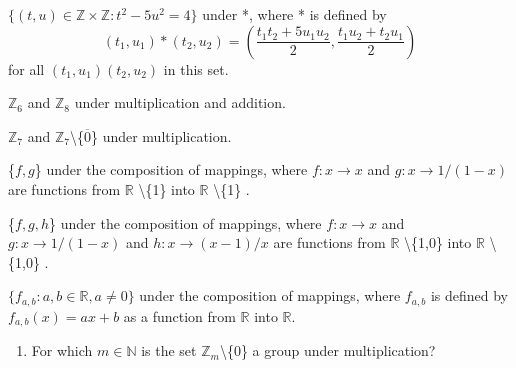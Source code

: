 \documentclass[11pt]{amsbook}
\begin{document}

\begin{hEnumerateAlpha}

	\item
	$\{(t,u) \in \mathbb{Z} \times \mathbb{Z} : t^2 - 5u^2 = 4\}$ under *, where * is defined by 
	\[ 
		(t_1,u_1) * ( t_2,u_2) = (\frac{t_1 t_2 + 5 u_1 u_2}{2}, \frac{t_1 u_2 + t_2 u_1}{2})
	\]
	for all $(t_1,u_1)(t_2,u_2)$ in this set.

	\item
	$\mathbb{Z}_6$ and $\mathbb{Z}_8$ under multiplication and addition.

	\item
	$\mathbb{Z}_7$ and $\mathbb{Z}_7$\textbackslash \{$\overline{0}$\} under multiplication.
	
	\item
	\{$f,g$\} under the composition of mappings, where $f: x \rightarrow x$ and $g: x \rightarrow 1/(1-x)$ are functions from $\mathbb{R}$ \textbackslash \{1\} into $\mathbb{R}$ \textbackslash \{1\} .

	\item
	\{$f,g,h$\} under the composition of mappings, where $f: x \rightarrow x$ and $g: x \rightarrow 1/(1-x)$ and $h: x \rightarrow (x-1)/x$ are functions from $\mathbb{R}$ \textbackslash \{1,0\} into $\mathbb{R}$ \textbackslash \{1,0\} .

	\item
	$\{f_{a,b}: a,b \in \mathbb{R}, a \neq 0\}$ under the composition of mappings, where $f_{a,b}$ is defined by $f_{a,b}(x) = ax + b$ as a function from $\mathbb{R}$  into $\mathbb{R}$.

\end{hEnumerateAlpha}

\begin{enumerate}

	\item
	For which $m \in \mathbb{N}$ is the set $\mathbb{Z}_m$\textbackslash\{0\} a group under multiplication?

\end{enumerate}
\end{document}

